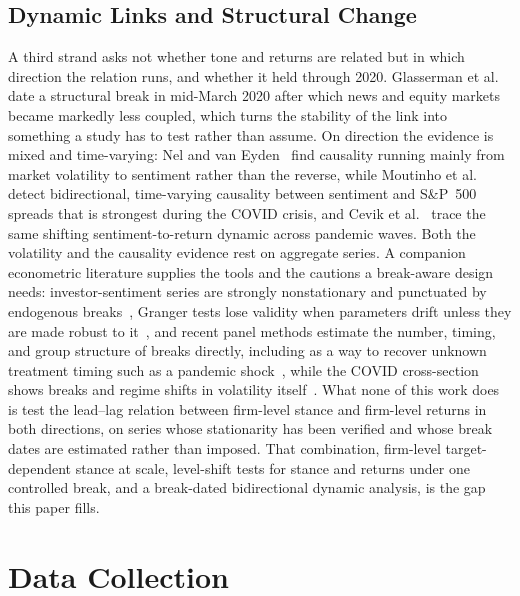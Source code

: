 \documentclass[conference]{IEEEtran}
\begin{document}
\subsection{Dynamic Links and Structural Change}
A third strand asks not whether tone and returns are related but in which direction the
relation runs, and whether it held through 2020. Glasserman et al.~\cite{glasserman2024}
date a structural break in mid-March 2020 after which news and equity markets became
markedly less coupled, which turns the stability of the link into something a study has
to test rather than assume. On direction the evidence is mixed and time-varying: Nel and
van Eyden~\cite{nel2026} find causality running mainly from market volatility to
sentiment rather than the reverse, while Moutinho et al.~\cite{moutinho2025} detect
bidirectional, time-varying causality between sentiment and S\&P~500 spreads that is
strongest during the COVID crisis, and Cevik et al.~\cite{cevik2022} trace the same
shifting sentiment-to-return dynamic across pandemic waves. Both the volatility and the
causality evidence rest on aggregate series. A companion econometric literature supplies
the tools and the cautions a break-aware design needs: investor-sentiment series are
strongly nonstationary and punctuated by endogenous breaks~\cite{ballinari2020}, Granger
tests lose validity when parameters drift unless they are made robust to
it~\cite{rossi2019}, and recent panel methods estimate the number, timing, and group
structure of breaks directly, including as a way to recover unknown treatment timing such
as a pandemic shock~\cite{ditzen2025, pretis2026, lumsdaine2023}, while the COVID
cross-section shows breaks and regime shifts in volatility itself~\cite{oliveira2024}.
What none of this work does is test the lead--lag relation between firm-level stance and
firm-level returns in both directions, on series whose stationarity has been verified and
whose break dates are estimated rather than imposed. That combination, firm-level
target-dependent stance at scale, level-shift tests for stance and returns under one
controlled break, and a break-dated bidirectional dynamic analysis, is the gap this paper
fills.

\section{Data Collection}
\end{document}

